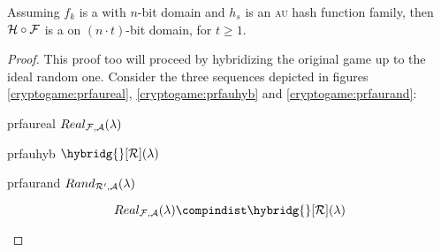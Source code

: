 \begin{theorem}
    Assuming $f_k$ is a \prf{} with $n$-bit domain and $h_s$ is an \textsc{au} hash function family, then $\mathcal{H} \circ \mathcal{F}$ is a \prf{} on $(n \cdot t)$-bit domain, for $t \geq 1$.
\end{theorem}

\begin{proof}

    This proof too will proceed by hybridizing the original game up to the ideal random one. Consider the three sequences depicted in figures \ref{cryptogame:prfaureal}, \ref{cryptogame:prfauhyb} and \ref{cryptogame:prfaurand}:

    \begin{cryptogame}
        {prfaureal}
        {$Real_{\mathcal{F}, \mathcal{A}}(\lambda)$}
        {}


        \cseqbeginloop
        \cseqendloop
        
    \end{cryptogame}

    \begin{cryptogame}
        {prfauhyb}
        {$\hybridg{}[\R](\lambda)$}
        {}


        \cseqbeginloop
        \cseqendloop
        
    \end{cryptogame}

    \begin{cryptogame}
        {prfaurand}
        {$Rand_{\mathcal{R}', \mathcal{A}}(\lambda)$}
        {}


        \cseqbeginloop
        \cseqendloop
        
    \end{cryptogame}


    \begin{lemma}
        \[
            Real_{\F, \A}(\lambda) \compindist \hybridg{}[\R](\lambda)
        \]
    \end{lemma}


\end{proof}

